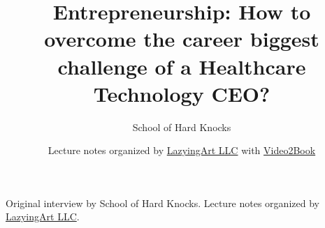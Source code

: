 \documentclass[11pt,oneside]{book}
\begin{document}
\frontmatter
\title{Entrepreneurship: How to overcome the career biggest challenge of a Healthcare Technology CEO?}
\author{School of Hard Knocks}
\date{Lecture notes organized by \href{https://lazying.art}{LazyingArt LLC} with \href{https://github.com/lachlanchen/Video2Book}{Video2Book}}
\maketitle
\begin{center}
\small Original interview by School of Hard Knocks. Lecture notes organized by \href{https://lazying.art}{LazyingArt LLC}.
\end{center}
\clearpage
\mainmatter

\end{document}
